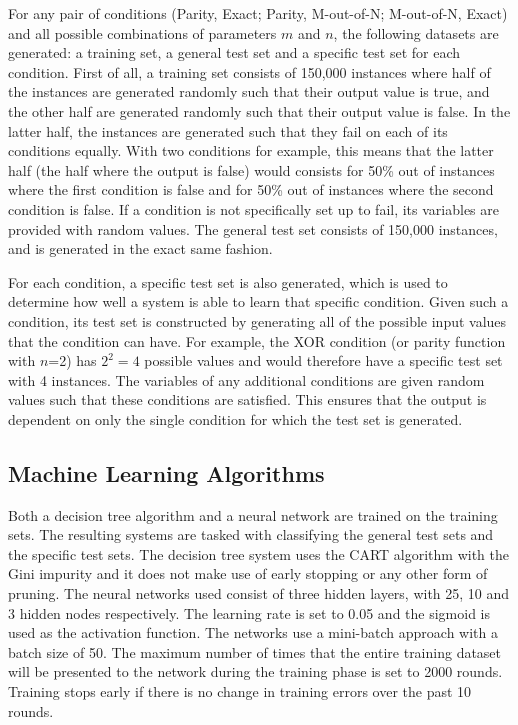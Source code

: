 \documentclass[letterpaper]{article} %
\begin{document}
For any pair of conditions (Parity, Exact; Parity, M-out-of-N; M-out-of-N, Exact) and all possible combinations of parameters $m$ and $n$, the following datasets are generated: a training set, a general test set and a specific test set for each condition. First of all, a training set consists of 150,000 instances where half of the instances are generated randomly such that their output value is true, and the other half are generated randomly such that their output value is false.  In the latter half, the instances are generated such that they fail on each of its conditions equally. With two conditions for example, this means that the latter half (the half where the output is false) would consists for 50\% out of instances where the first condition is false and for 50\% out of instances where the second condition is false. If a condition is not specifically set up to fail, its variables are provided with random values. The general test set consists of 150,000 instances, and is generated in the exact same fashion.

For each condition, a specific test set is also generated, which is used to determine how well a system is able to learn that specific condition. Given such a condition, its test set is constructed by generating all of the possible input values that the condition can have. For example, the XOR condition (or parity function with $n$=2) has $2^2=4$ possible values and would therefore have a specific test set with 4 instances. The variables of any additional conditions are given random values such that these conditions are satisfied. This ensures that the output is dependent on only the single condition for which the test set is generated. %



\subsection{Machine Learning Algorithms}
Both a decision tree algorithm and a neural network are trained on the training sets. The resulting systems are tasked with classifying the general test sets and the specific test sets. The decision tree system uses the CART algorithm \cite{breiman1984classification} with the Gini impurity and it does not make use of early stopping or any other form of pruning. The neural networks used consist of three hidden layers, with 25, 10 and 3 hidden nodes respectively. The learning rate is set to 0.05 and the sigmoid is used as the activation function. The networks use a mini-batch approach with a batch size of 50. The maximum number of times that the entire training dataset will be presented to the network during the training phase is set to 2000 rounds. Training stops early if there is no change in training errors over the past 10 rounds.
\end{document}
